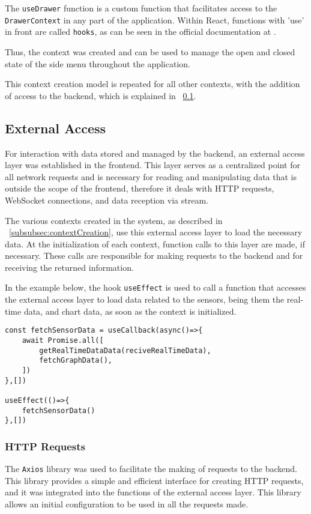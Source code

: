 The \texttt{useDrawer} function is a custom function that facilitates access to the \texttt{DrawerContext} in any part of the application. Within React, functions with 'use' in front are called \texttt{hooks}, as can be seen in the official documentation at \cite{reactHooksReference}.

Thus, the context was created and can be used to manage the open and closed state of the side menu throughout the application.

This context creation model is repeated for all other contexts, with the addition of access to the backend, which is explained in ~\ref{subsec:api_access}.

\subsection{External Access}\label{subsec:api_access}
For interaction with data stored and managed by the backend, an external access layer was established in the frontend. This layer serves as a centralized point for all network requests and is necessary for reading and manipulating data that is outside the scope of the frontend, therefore it deals with HTTP requests, WebSocket connections, and data reception via stream.

The various contexts created in the system, as described in ~\ref{subsubsec:contextCreation}, use this external access layer to load the necessary data. At the initialization of each context, function calls to this layer are made, if necessary. These calls are responsible for making requests to the backend and for receiving the returned information.

In the example below, the hook \texttt{useEffect} \cite{reactUseEffect} is used to call a function that accesses the external access layer to load data related to the sensors, being them the real-time data, and chart data, as soon as the context is initialized.

\begin{Verbatim}[fontsize=\small, baselinestretch=0.8]
const fetchSensorData = useCallback(async()=>{
    await Promise.all([
        getRealTimeDataData(reciveRealTimeData),
        fetchGraphData(),
    ])
},[])

useEffect(()=>{
    fetchSensorData()
},[])
\end{Verbatim}


\subsubsection{HTTP Requests}\label{subsubsec:httpRequest}
The \texttt{Axios} library \cite{axiosIntro} was used to facilitate the making of requests to the backend. This library provides a simple and efficient interface for creating \gls{HTTP} requests, and it was integrated into the functions of the external access layer. This library allows an initial configuration to be used in all the requests made.

